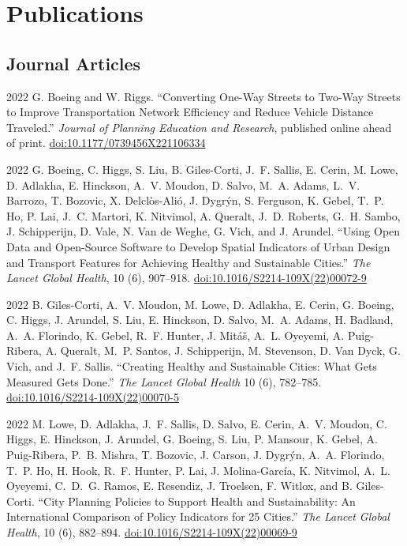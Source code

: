 \documentclass[12pt,letterpaper]{report}
\begin{document}
    \section*{Publications}

    \subsection*{Journal Articles}

    \begin{tablist}

        \item[2022] \tab{}G. Boeing and W. Riggs. \enquote{Converting One-Way Streets to Two-Way Streets to Improve Transportation Network Efficiency and Reduce Vehicle Distance Traveled.} \textit{Journal of Planning Education and Research}, published online ahead of print. \href{https://doi.org/10.1177/0739456X221106334}{doi:10.1177/0739456X221106334}

        \item[2022] \tab{}G. Boeing, C. Higgs, S. Liu, B. Giles-Corti, J.~F. Sallis, E. Cerin, M. Lowe, D. Adlakha, E. Hinckson, A.~V. Moudon, D. Salvo, M.~A. Adams, L.~V. Barrozo, T. Bozovic, X. Delclòs-Alió, J. Dygrýn, S. Ferguson, K. Gebel, T.~P. Ho, P. Lai, J.~C. Martori, K. Nitvimol, A. Queralt, J.~D. Roberts, G.~H. Sambo, J. Schipperijn, D. Vale, N. Van de Weghe, G. Vich, and J. Arundel. \enquote{Using Open Data and Open-Source Software to Develop Spatial Indicators of Urban Design and Transport Features for Achieving Healthy and Sustainable Cities.} \textit{The Lancet Global Health}, 10 (6), 907--918. \href{https://doi.org/10.1016/S2214-109X(22)00072-9}{doi:10.1016/S2214-109X(22)00072-9}

        \item[2022] \tab{}B. Giles-Corti, A.~V. Moudon, M. Lowe, D. Adlakha, E. Cerin, G. Boeing, C. Higgs, J. Arundel, S. Liu, E. Hinckson, D. Salvo, M.~A. Adams, H. Badland, A.~A. Florindo, K. Gebel, R.~F. Hunter, J. Mitáš, A.~L. Oyeyemi, A. Puig-Ribera, A. Queralt, M.~P. Santos, J. Schipperijn, M. Stevenson, D. Van Dyck, G. Vich, and J.~F. Sallis. \enquote{Creating Healthy and Sustainable Cities: What Gets Measured Gets Done.} \textit{The Lancet Global Health} 10 (6), 782--785. \href{https://doi.org/10.1016/S2214-109X(22)00070-5}{doi:10.1016/S2214-109X(22)00070-5}

        \item[2022] \tab{}M. Lowe, D. Adlakha, J.~F. Sallis, D. Salvo, E. Cerin, A.~V. Moudon, C. Higgs, E. Hinckson, J. Arundel, G. Boeing, S. Liu, P. Mansour, K. Gebel, A. Puig-Ribera, P.~B. Mishra, T. Bozovic, J. Carson, J. Dygrýn, A.~A. Florindo, T.~P. Ho, H. Hook, R.~F. Hunter, P. Lai, J. Molina-García, K. Nitvimol, A.~L. Oyeyemi, C.~D.~G. Ramos, E. Resendiz, J. Troelsen, F. Witlox, and B. Giles-Corti. \enquote{City Planning Policies to Support Health and Sustainability: An International Comparison of Policy Indicators for 25 Cities.}  \textit{The Lancet Global Health}, 10 (6), 882--894. \href{https://doi.org/10.1016/S2214-109X(22)00069-9}{doi:10.1016/S2214-109X(22)00069-9}


\end{tablist}
\end{document}

